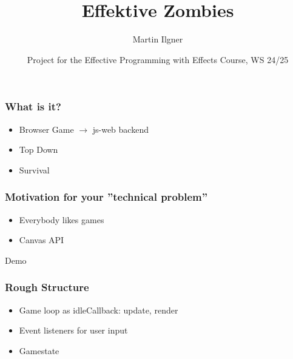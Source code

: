 \documentclass{beamer}
\title{Effektive Zombies}
\author{Martin Ilgner}
\institute{University of Tübingen}
\date{Project for the Effective Programming with Effects Course, WS 24/25}
\begin{document}
	
	
	\frame{\titlepage}
	
	\begin{frame}
		\frametitle{What is it?}
		\begin{Large}
		\begin{itemize}
			\setlength{\itemsep}{.5em}
			\item Browser Game $\rightarrow$ js-web backend
			\item Top Down 
			\item Survival
		\end{itemize}
		\end{Large}
	\end{frame}
	
	\begin{frame}
		\frametitle{Motivation for your ''technical problem''}
		\begin{Large}
		\begin{itemize}
			\setlength{\itemsep}{1em}
			\item<2-> Everybody likes games
			\item<2-> Canvas API
		\end{itemize}
		\end{Large}
	\end{frame}
	
	\begin{frame}[plain, c]
		\begin{center}
			\Huge Demo
		\end{center}
	\end{frame}
	
	\begin{frame}
		\frametitle{Rough Structure}
		\begin{Large}
		\begin{itemize}
			\setlength{\itemsep}{.5em}
			\item Game loop as idleCallback: update, render
			\item Event listeners for user input
			\item Gamestate
		\end{itemize}
		\end{Large}
	\end{frame}
	
\end{document}
